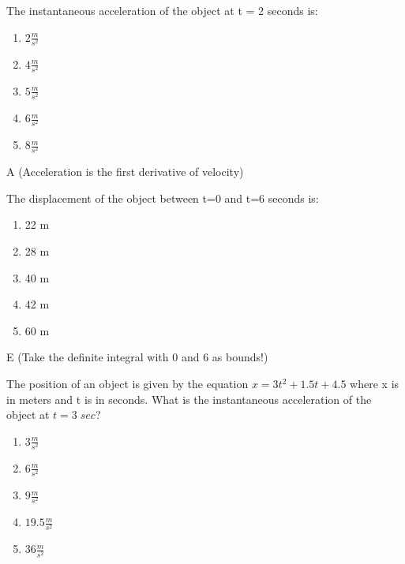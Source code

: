 
\begin{question}
The instantaneous acceleration of the object at t = 2 seconds is:
\begin{multicols}{5}
\begin{enumerate}
    \item $2\frac{m}{s^2}$
    \item $4\frac{m}{s^2}$
    \item $5\frac{m}{s^2}$
    \item $6\frac{m}{s^2}$
    \item $8\frac{m}{s^2}$
\end{enumerate}
\end{multicols}
\end{question}

\begin{solution}
A (Acceleration is the first derivative of velocity)
\end{solution}


\begin{question}
The displacement of the object between t=0 and t=6 seconds is:
\begin{multicols}{5}
\begin{enumerate}
    \item 22 m
    \item 28 m
    \item 40 m
    \item 42 m
    \item 60 m
\end{enumerate}
\end{multicols}
\end{question}

\begin{solution}
E (Take the definite integral with 0 and 6 as bounds!)
\end{solution}


\begin{question}
The position of an object is given by the equation $x=3t^2+1.5t+4.5$ where x is in meters and t is in seconds. What is the instantaneous acceleration of the object at $t=3\;sec$?

\begin{multicols}{5}
\begin{enumerate}
    \item $3 \frac{m}{s^2}$
    \item $6 \frac{m}{s^2}$
    \item $9 \frac{m}{s^2}$
    \item $19.5 \frac{m}{s^2}$
    \item $36 \frac{m}{s^2}$
\end{enumerate}
\end{multicols}
\end{question}

